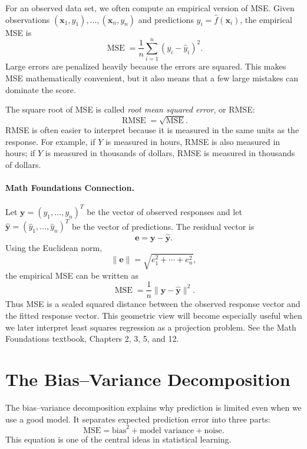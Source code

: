 {For an observed data set, we often compute an empirical version of MSE.  Given observations $(\mathbf{x}_1,y_1),\ldots,(\mathbf{x}_n,y_n)$ and predictions $\hat y_i=\hat f(\mathbf{x}_i)$, the empirical MSE is
\begin{equation}
  \operatorname{MSE}
  = \frac{1}{n}\sum_{i=1}^n (y_i - \hat y_i)^2.
  \label{eq:ch2-empirical-mse}
\end{equation}
Large errors are penalized heavily because the errors are squared.  This makes MSE mathematically convenient, but it also means that a few large mistakes can dominate the score.

The square root of MSE is called \emph{root mean squared error}, or RMSE:
\begin{equation}
  \operatorname{RMSE}
  = \sqrt{\operatorname{MSE}}.
  \label{eq:ch2-rmse}
\end{equation}
RMSE is often easier to interpret because it is measured in the same units as the response.  For example, if $Y$ is measured in hours, RMSE is also measured in hours; if $Y$ is measured in thousands of dollars, RMSE is measured in thousands of dollars.

\paragraph{Math Foundations Connection.}
Let $\mathbf{y}=(y_1,\ldots,y_n)^T$ be the vector of observed responses and let $\hat{\mathbf{y}}=(\hat y_1,\ldots,\hat y_n)^T$ be the vector of predictions.  The residual vector is
\[
  \mathbf{e}=\mathbf{y}-\hat{\mathbf{y}}.
\]
Using the Euclidean norm,
\[
  \|\mathbf{e}\| = \sqrt{e_1^2+\cdots+e_n^2},
\]
the empirical MSE can be written as
\begin{equation}
  \operatorname{MSE}=\frac{1}{n}\|\mathbf{y}-\hat{\mathbf{y}}\|^2.
  \label{eq:ch2-mse-norm}
\end{equation}
Thus MSE is a scaled squared distance between the observed response vector and the fitted response vector.  This geometric view will become especially useful when we later interpret least squares regression as a projection problem.  See the Math Foundations textbook, Chapters 2, 3, 5, and 12.

\section{The Bias--Variance Decomposition}

The bias--variance decomposition explains why prediction is limited even when we use a good model.  It separates expected prediction error into three parts:
\begin{equation}
  \text{MSE} = \text{bias}^2 + \text{model variance} + \text{noise}.
  \label{eq:ch2-bv-summary}
\end{equation}
This equation is one of the central ideas in statistical learning.

}
